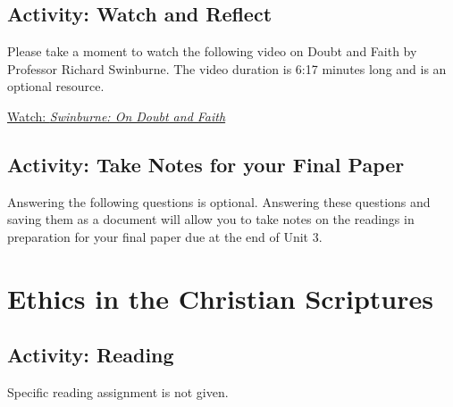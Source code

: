 \documentclass[
]{book}
\begin{document}
\hypertarget{activity-watch-and-reflect-6}{%
\subsection*{Activity: Watch and Reflect}\label{activity-watch-and-reflect-6}}

\begin{reflect}
Please take a moment to watch the following video on Doubt and Faith by Professor Richard Swinburne. The video duration is 6:17 minutes long and is an optional resource.

\href{Swinburne:\%20On\%20Doubt\%20and\%20Faith}{Watch: \emph{Swinburne: On Doubt and Faith}}
\end{reflect}

\hypertarget{activity-take-notes-for-your-final-paper}{%
\subsection*{Activity: Take Notes for your Final Paper}\label{activity-take-notes-for-your-final-paper}}

\begin{reflect}
Answering the following questions is optional. Answering these questions and saving them as a document will allow you to take notes on the readings in preparation for your final paper due at the end of Unit 3.
\end{reflect}

\hypertarget{ethics-in-the-christian-scriptures}{%
\section{Ethics in the Christian Scriptures}\label{ethics-in-the-christian-scriptures}}

\hypertarget{activity-reading-6}{%
\subsection*{Activity: Reading}\label{activity-reading-6}}

\begin{reflect}
{Specific reading assignment is not given.}
\end{reflect}
\end{document}
